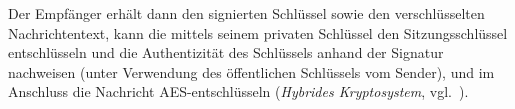 \noindent
Der Empfänger erhält dann den signierten Schlüssel sowie den verschlüsselten Nachrichtentext, kann die mittels seinem privaten Schlüssel den Sitzungsschlüssel entschlüsseln und die Authentizität des Schlüssels anhand der Signatur nachweisen (unter Verwendung des öffentlichen Schlüssels vom Sender), und im Anschluss die Nachricht AES-entschlüsseln (\textit{Hybrides Kryptosystem}, vgl.~\cite[95 f.]{ITS3}).